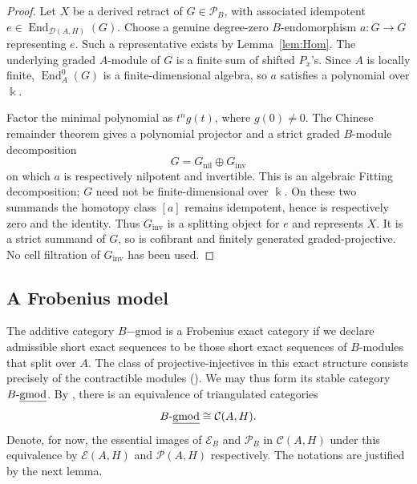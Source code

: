 \documentclass[11pt]{article}
\theoremstyle{definition}
\numberwithin{equation}{section}
\def\udgmod{\mbox{-\underline{gmod}}}
\def\dgmod{\operatorname{-{gmod}}}
\newcommand{\kk}{\Bbbk}
\newcommand{\Pun}{\mathcal{P}_B}
\newcommand{\E}{\mathcal E}
\newcommand{\Tcat}{\mathcal{P}(A,H)}
\newcommand{\End}{\operatorname{End}}
\newcommand{\Cat}{\mathcal{C}}
\newcommand{\Der}{\mathcal{D}}
\newcommand{\Ecat}{\mathcal{E}_B}
\begin{document}
\begin{proof}
Let $X$ be a derived retract of $G\in\Pun$, with associated idempotent
$e\in\End_{\Der(A,H)}(G)$.  Choose a genuine degree-zero $B$-endomorphism
$a:G\to G$ representing $e$.  Such a representative exists by
Lemma~\ref{lem:Hom}.  The underlying graded $A$-module of $G$ is a finite
sum of shifted $P_x$'s.  Since $A$ is locally finite,
$\End_A^0(G)$ is a finite-dimensional algebra, so $a$ satisfies a
polynomial over $\kk$.

Factor the minimal polynomial as $t^n g(t)$, where $g(0)\ne0$.
The Chinese remainder theorem gives a polynomial projector and a
strict graded $B$-module decomposition
\[
 G=G_{\mathrm{nil}}\oplus G_{\mathrm{inv}}
\]
on which $a$ is respectively nilpotent and invertible.  This is an
algebraic Fitting decomposition; $G$ need not be finite-dimensional
over $\kk$.  On these two summands the homotopy class $[a]$ remains
idempotent, hence is respectively zero and the identity.  Thus
$G_{\mathrm{inv}}$ is a splitting object for $e$ and represents $X$.
It is a strict summand of $G$, so is cofibrant and finitely generated
graded-projective.  No cell filtration of $G_{\mathrm{inv}}$ has been
used.
\end{proof}

\subsection{A Frobenius model}\label{subsec:Frob-model}
The additive category $B\dgmod$ is a Frobenius exact category if we declare admissible short exact sequences to be those short exact sequences of $B$-modules that split over $A$. The class of projective-injectives in this exact structure consists precisely of the contractible modules (\cite[Lemma 3.1--3.3]{QYRickard}). We may thus form its stable category $B\udgmod$. By \cite[Theorem 3.4]{QYRickard}, there is an equivalence of triangulated categories
\begin{equation}
    B\udgmod \cong \Cat(A,H).
\end{equation}
Denote, for now, the essential images of $\Ecat$ and $\Pun$ in $\Cat (A,H)$ under this equivalence by $\E(A,H)$ and $\Tcat$ respectively. The notations are justified by the next lemma.
\end{document}
